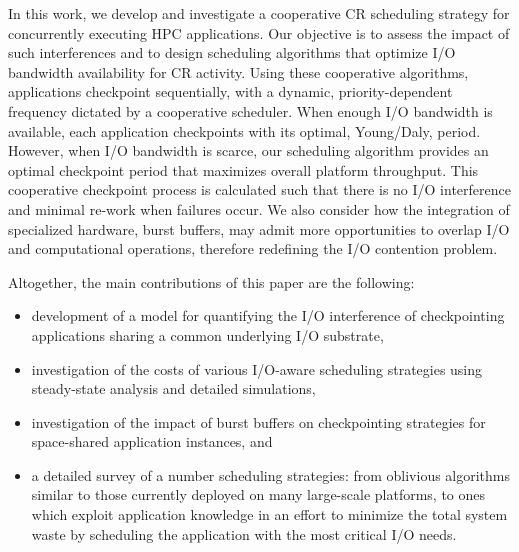 \documentclass[two]{article}
\begin{document}
In this work, we develop and investigate a cooperative CR scheduling strategy for
concurrently executing HPC applications.  Our objective is to assess the impact of
such interferences and to design scheduling algorithms that optimize I/O bandwidth
availability for CR activity.  Using these cooperative algorithms, applications
checkpoint sequentially, with a dynamic, priority-dependent frequency dictated by a
cooperative scheduler.  When enough I/O bandwidth is available, each application
checkpoints with its optimal, Young/Daly, period.  However, when I/O bandwidth is
scarce, our scheduling algorithm provides an optimal checkpoint period that maximizes
overall platform throughput. This cooperative checkpoint process is calculated such
that there is no I/O interference and minimal re-work when failures occur.  We also
consider how the integration of specialized hardware, burst buffers, may admit more
opportunities to overlap I/O and computational operations, therefore redefining the
I/O contention problem.


Altogether, the main contributions of this paper are the following:

\begin{itemize}

\item development of a model for quantifying the I/O interference of checkpointing
  applications sharing a common underlying I/O substrate,

\item investigation of the costs of various I/O-aware scheduling strategies using
  steady-state analysis and detailed simulations,

\item investigation of the impact of burst buffers on checkpointing strategies for
  space-shared application instances, and

\item a detailed survey of a number scheduling strategies: from oblivious algorithms
  similar to those currently deployed on many large-scale platforms, to ones which
  exploit application knowledge in an effort to minimize the total system waste by
  scheduling the application with the most critical I/O needs.

\end{itemize}

\end{document}
